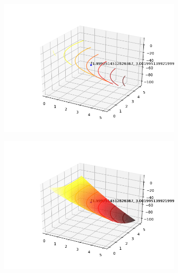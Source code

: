 \documentclass[a4paper, 12pt]{article}
\begin{document}
\begin{figure}[H]
\centering
\begin{subfigure}{0.3\textwidth}
  \centering
  \includegraphics[width=\linewidth]{5/MPFE/A/Powell/contorno.png}
\end{subfigure}%
\begin{subfigure}{0.3\textwidth}
  \centering
  \includegraphics[width=\linewidth]{5/MPFE/A/Powell/superficie.png}
\end{subfigure}
\begin{subfigure}{0.3\textwidth}
  \centering

\end{subfigure}
\end{figure}
\end{document}
